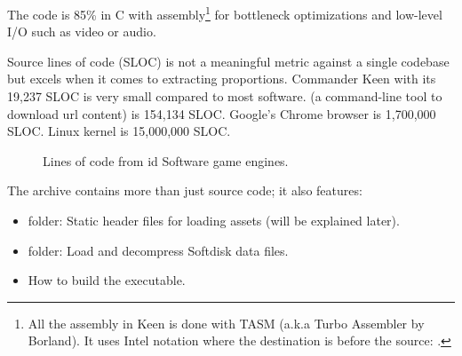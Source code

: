 \documentclass[book.tex]{subfiles}
\begin{document}
\par
 The code is 85\% in C with assembly\footnote{All the assembly in Keen is done with TASM (a.k.a Turbo Assembler by Borland). It uses Intel notation where the destination is before the source:   .} for bottleneck optimizations and low-level I/O such as video or audio.\\
 \par
   Source lines of code (SLOC) is not a meaningful metric against a single codebase but excels when it comes to extracting proportions. Commander Keen with its 19,237 SLOC is very small compared to most software.  (a command-line tool to download url content) is 154,134 SLOC. Google's Chrome browser is 1,700,000 SLOC. Linux kernel is 15,000,000 SLOC.\\
 \par
\begin{figure}[H]
\centering
   \caption{Lines of code from id Software game engines.}
 \end{figure}
 
\par


 
The archive contains more than just source code; it also features:
\begin{itemize}
\item {} folder: Static header files for loading assets (will be explained later).
\item {} folder: Load and decompress Softdisk data files.
\item {} How to build the executable. 
\end{itemize}
\end{document}
